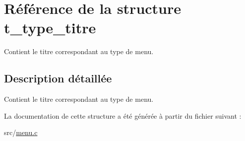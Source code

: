 \hypertarget{structt__type__titre}{}\section{Référence de la structure t\+\_\+type\+\_\+titre}
\label{structt__type__titre}


Contient le titre correspondant au type de menu.  




\subsection{Description détaillée}
Contient le titre correspondant au type de menu. 

La documentation de cette structure a été générée à partir du fichier suivant \+:\begin{DoxyCompactItemize}
\item 
src/\hyperlink{menu_8c}{menu.\+c}\end{DoxyCompactItemize}
